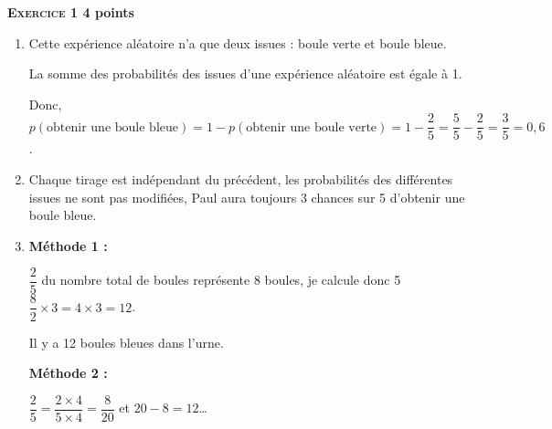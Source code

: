 \textbf{\textsc{Exercice 1} \hfill 4 points}

\medskip

\begin{enumerate}
\item Cette expérience aléatoire n'a que deux issues : boule verte et boule bleue.

La somme des probabilités des issues d'une expérience aléatoire est égale à 1.

Donc, $p(\text{obtenir une boule bleue}) = 1 - p(\text{obtenir une boule verte}) = 1 - \dfrac{2}{5} = \dfrac{5}{5} - \dfrac{2}{5}  =\dfrac{3}{5} = 0,6$.
\item Chaque tirage est indépendant du précédent, les probabilités des différentes
issues ne sont pas modifiées, Paul aura toujours 3 chances sur 5 d'obtenir une
boule bleue.
\item
 
\textbf{Méthode 1 :}
 
$\dfrac{2}{5}$ du nombre total de boules représente 8 boules, je calcule donc
5
$\dfrac{8}{2} \times  3 = 4 \times 3 = 12$.
 
Il y a 12 boules bleues dans l'urne.
 
\textbf{Méthode 2 :}
 
$\dfrac{2}{5} = \dfrac{2\times 4}{5\times 4} = \dfrac{8}{20}$ et $20 - 8 = 12$\ldots 
\end{enumerate}

\bigskip

